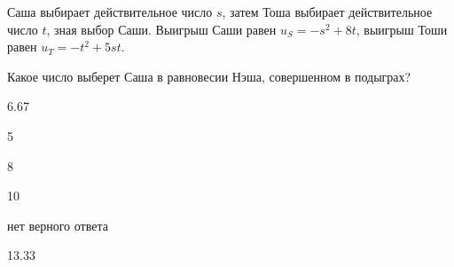
\begin{question}
Саша выбирает действительное число \(s\), затем Тоша выбирает
действительное число \(t\), зная выбор Саши. Выигрыш Саши равен
\(u_S = -s^2 + 8t\), выигрыш Тоши равен \(u_T = -t^2 + 5 st\).

Какое число выберет Саша в равновесии Нэша, совершенном в подыграх?
\begin{answerlist}
  \item 6.67
  \item 5
  \item 8
  \item 10
  \item нет верного ответа
  \item 13.33
\end{answerlist}
\end{question}



